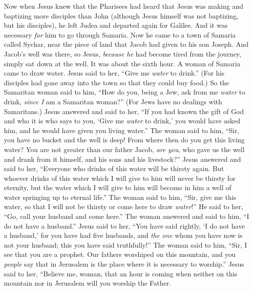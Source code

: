\begin{biblechapter} %
 Now when Jesus knew that the Pharisees had heard that Jesus was making and baptizing more disciples than John
\verse (although Jesus himself was not baptizing, but his disciples),
\verse he left Judea and departed again for Galilee.
\verse And it was necessary \textit{for} him to go through Samaria.
\verse Now he came to a town of Samaria called Sychar, near the piece of land that Jacob had given to his son Joseph.
\verse And Jacob’s well was there, so Jesus, \textit{because he} had become tired from the journey, simply sat down at the well. It was about the sixth hour.
\verse A woman of Samaria came to draw water. Jesus said to her, “Give me \textit{water} to drink.”
\verse (For his disciples had gone away into the town so that they could buy food.)
\verse So the Samaritan woman said to him, “How do you, being a Jew, ask from me \textit{water} to drink, \textit{since I} am a Samaritan woman?” (For Jews have no dealings with Samaritans.)
\verse Jesus answered and said to her, “If you had known the gift of God and who it is who says to you, ‘Give me \textit{water} to drink,’ you would have asked him, and he would have given you living water.”
\verse The woman said to him, “Sir, you have no bucket and the well is deep! From where then do you get this living water?
\verse You are not greater than our father Jacob, \textit{are you}, who gave us the well and drank from it himself, and his sons and his livestock?”
\verse Jesus answered and said to her, “Everyone who drinks of this water will be thirsty again.
\verse But whoever drinks of this water which I will give to him will never be thirsty for eternity, but the water which I will give to him will become in him a well of water springing up to eternal life.”
\verse The woman said to him, “Sir, give me this water, so that I will not be thirsty or come here to draw \textit{water}!”
\verse He said to her, “Go, call your husband and come here.”
\verse The woman answered and said to him, “I do not have a husband.” Jesus said to her, “You have said rightly, ‘I do not have a husband,’
\verse for you have had five husbands, and \textit{the one} whom you have now is not your husband; this you have said truthfully!”
\verse The woman said to him, “Sir, I see that you are a prophet.
\verse Our fathers worshiped on this mountain, and you \textit{people} say that in Jerusalem is the place where it is necessary to worship.”
\verse Jesus said to her, “Believe me, woman, that an hour is coming when neither on this mountain nor in Jerusalem will you worship the Father.

\end{biblechapter}
